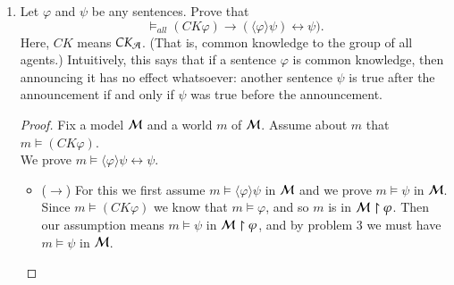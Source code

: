 \documentclass[11pt]{article}
\renewcommand{\phi}{\varphi}
\newcommand{\iif}{\rightarrow}
\newcommand{\iiff}{\leftrightarrow}
\newcommand{\pair}[1]{\langle #1\rangle}
\newcommand{\K}{K}
\newcommand{\nott}{\neg}
\newcommand{\abovearrow}[1]{\rightarrow\hspace{-.17in}\raisebox{1.0ex}
{$\scriptscriptstyle{#1}$}\hspace{.1in}}
\newcommand{\arrowa}{\,\lower1pt\hbox{$\abovearrow{a}$}}
\begin{document}
\begin{enumerate}
\begin{proof}
  Inductive Step: We assume for all worlds $x$ reachable from $w$,
  \[ x^* \models\phi \mbox{ in $\Model(w)$ \quad if and only if \quad $x\models \phi$ in $\Model$}
  \]
  And we prove for all worlds $y$ reachable from $w$,
  \[ y^* \models K_a \phi \mbox{ in $\Model(w)$ \quad if and only if \quad $y\models K_a \phi$ in $\Model$}
  \]
  For this, assume $y^* \models K_a \phi$ in $\Model(w)$and suppose, towards a contradiction, that $y \models \nott K_a \phi$ in $\Model$.
  This means there exists a world $v$ such that $y \arrowa v$ and $v \models \nott \phi$. Our first assumption means that $v^* \models \phi$, but applying our  induciton hypothesis tells us $v^* \models \phi \iff v \models \phi$.
  So we have a contradiciton, and we must have $y \models \K_a \phi$. 

  Our proof by induction shows that for all worlds $z$ which are reachable from $w$ by some sequence of arrows,
   \[ z^* \models\phi \mbox{ in $\Model(w)$ \quad if and only if \quad $z\models \phi$ in $\Model$}
   \]
\end{proof}

\newpage

\item   Let $\phi$ and $\psi$ be any sentences.
Prove that $$\models_{all} (CK \phi)\iif (\pair{\phi}\psi) \iiff \psi).$$
Here, $CK$ means $CK_{\cal A}$.  (That is, common knowledge to the group of
all agents.)
Intuitively, this says that if a sentence $\phi$ is common knowledge,
then announcing it has no effect whatsoever: another sentence $\psi$ 
is true after the announcement if and only if $\psi$ was true before the announcement.

\begin{proof}
  Fix a model $\Model$ and a world $m$ of $\Model$. Assume about $m$ that $m \models (CK \phi)$. \\
  We prove $m \models \pair{\phi}\psi \iiff \psi$. 

  \begin{itemize}

  \item ($\rightarrow$)  For this we first assume $m \models \pair{\phi}\psi$ in $\Model$ and we
    prove $m \models \psi$ in $\Model$. \\
      Since $m \models (CK \phi)$ we know that $m \models \phi$, and so $m$ is in $\Model \upharpoonright \phi$.
      Then our assumption means $m \models \psi$ in $\Model \upharpoonright \phi$, and by problem 3 we must
      have $m \models \psi$ in $\Model$. 


\end{itemize}
\end{proof}
\end{enumerate}
\end{document}
